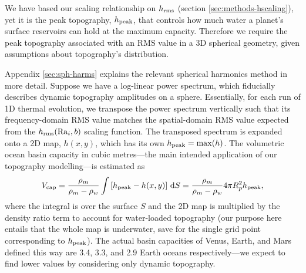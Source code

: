 We have based our scaling relationship on $h_{\rm rms}$ (section \ref{sec:methods-hscaling}), yet it is the peak topography, $h_{\rm peak}$, that controls how much water a planet's surface reservoirs can hold at the maximum capacity. Therefore we require the peak topography associated with an RMS value in a 3D spherical geometry, given assumptions about topography's distribution. 

Appendix \ref{sec:sph-harms} explains the relevant spherical harmonics method in more detail. Suppose we have a log-linear power spectrum, which fiducially describes dynamic topography amplitudes on a sphere. Essentially, for each run of 1D thermal evolution, we transpose the power spectrum vertically such that its frequency-domain RMS value matches the spatial-domain RMS value expected from the $h_{\rm rms}({\rm Ra}_i, b)$ scaling function. The transposed spectrum is expanded onto a 2D map, $h(x, y)$, which has its own $h_{\rm peak} = {\rm max}(h)$. The volumetric ocean basin capacity in cubic metres---the main intended application of our topography modelling---is estimated as
\begin{equation}\label{eq:ocean-integral}
V_{\rm cap} = \frac{\rho_m}{\rho_m - \rho_w} \int \left[h_{\rm peak} - h(x, y)\right] \, {\rm d} S = \frac{\rho_m}{\rho_m - \rho_w} 4 \pi R_p^2 h_{\rm peak},
\end{equation}
where the integral is over the surface $S$ and the 2D map is multiplied by the density ratio term to account for water-loaded topography (our purpose here entails that the whole map is underwater, save for the single grid point corresponding to $h_{\rm peak}$). The actual basin capacities of Venus, Earth, and Mars defined this way are 3.4, 3.3, and 2.9 Earth oceans respectively---we expect to find lower values by considering only dynamic topography.

